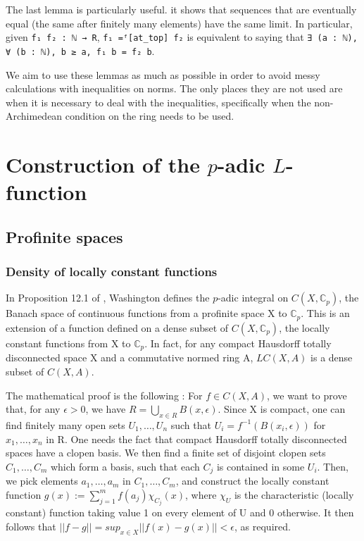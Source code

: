 \documentclass[a4paper,UKenglish,cleveref, autoref, thm-restate]{lipics-v2021}
\newcommand{\lean}[1]{\texttt{#1}\xspace} %
\begin{document}
The last lemma is particularly useful. it shows that sequences that are eventually equal (the same after finitely many 
elements) have the same limit. In particular, given \lean{f₁ f₂ : ℕ → R}, \lean{f₁ =ᶠ[at\_top] f₂} is equivalent to saying that 
\lean{∃ (a : ℕ), ∀ (b : ℕ), b ≥ a, f₁ b = f₂ b}. 

We aim to use these lemmas as much as possible in order to avoid messy calculations with inequalities on norms. The only places they are 
not used are when it is necessary to deal with the inequalities, specifically when the non-Archimedean condition on the ring needs to be used.

\section{Construction of the $p$-adic $L$-function}
\label{section3}
\subsection{Profinite spaces}
\subsubsection{Density of locally constant functions}
In Proposition 12.1 of \cite{cyc}, Washington defines the $p$-adic integral on $C(X, \mathbb{C}_p)$,
the Banach space of continuous functions from a profinite space X to $\mathbb{C}_p$.
This is an extension of a function defined on a dense subset of $C(X, \mathbb{C}_p)$, the
locally constant functions from X to $\mathbb{C}_p$. In fact, for any compact
Hausdorff totally disconnected space X and a commutative
normed ring A, $LC(X, A)$ is a dense subset of $C(X, A)$. 

The mathematical proof is the following : For $f \in C(X, A)$, we want to prove that,
for any $\epsilon > 0$, we have $R = \bigcup_{x \in R} B(x, \epsilon)$. Since X is compact,
one can find finitely many open sets $U_1, \dots, U_n$ such that $U_i = f^{-1}(B(x_i, \epsilon))$
for $x_1, \dots, x_n$ in R. One needs the fact that compact Hausdorff totally disconnected spaces
have a clopen basis. We then find a finite set of disjoint clopen sets $C_1, \dots, C_m$ which form
a basis, such that each $C_j$ is contained in some $U_i$.
Then, we pick elements $a_1, \dots, a_m$ in $C_1, \dots, C_m$, and construct the locally constant
function $g(x) := \sum_{j = 1}^m f(a_j) \chi_{C_j}(x)$, where $\chi_U$ is the characteristic
(locally constant) function taking value 1 on every element of U and 0 otherwise. It then follows
that $|| f - g || = sup_{x \in X} ||f(x) - g(x)|| < \epsilon$, as required. 
\end{document}

